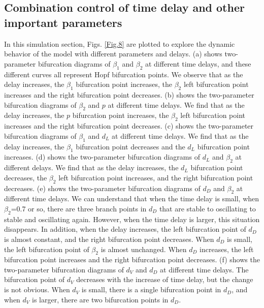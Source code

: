 \documentclass{CMHPhD-SIVD}
\begin{document}
\subsection{Combination control of time delay and other important parameters}
In this simulation section, Figs. \ref{Fig.8} are plotted to explore the dynamic behavior of the model with different parameters and delays.
(a) shows two-parameter bifurcation diagrams of $\beta_1$ and $\beta_2$ at different time delays, and these different curves all represent Hopf bifurcation points. We observe that as the delay increases, the $\beta_1$ bifurcation point increases, the $\beta_2$ left bifurcation point increases and the right bifurcation point decreases. (b) shows the two-parameter bifurcation diagrams of $\beta_2$ and $p$ at different time delays. We find that as the delay increases, the $p$ bifurcation point increases, the $\beta_2$ left bifurcation point increases and the right bifurcation point decreases. (c) shows the two-parameter bifurcation diagrams of $\beta_1$ and $d_L$ at different time delays. We find that as the delay increases, the $\beta_1$ bifurcation point decreases and the $d_L$ bifurcation point increases. (d) shows the two-parameter bifurcation diagrams of $d_L$ and $\beta_2$ at different delays. We find that as the delay increases, the $d_L$ bifurcation point decreases, the $\beta_2$ left bifurcation point increases, and the right bifurcation point decreases. (e) shows the two-parameter bifurcation diagrams of $d_D$ and $\beta_2$ at different time delays. We can understand that when the time delay is small, when $\beta_2$=0.7 or so, there are three branch points in $d_D$ that are stable to oscillating to stable and oscillating again. However, when the time delay is larger, this situation disappears. In addition, when the delay increases, the left bifurcation point of $d_D$ is almost constant, and the right bifurcation point decreases. When $d_D$ is small, the left bifurcation point of $\beta_2$ is almost unchanged. When $d_D$ increases, the left bifurcation point increases and the right bifurcation point decreases. (f) shows the two-parameter bifurcation diagrams of $d_V$ and $d_D$ at different time delays. The bifurcation point of $d_V$ decreases with the increase of time delay, but the change is not obvious. When $d_V$ is small, there is a single bifurcation point in $d_D$, and when $d_V$ is larger, there are two bifurcation points in $d_D$.
\end{document}
